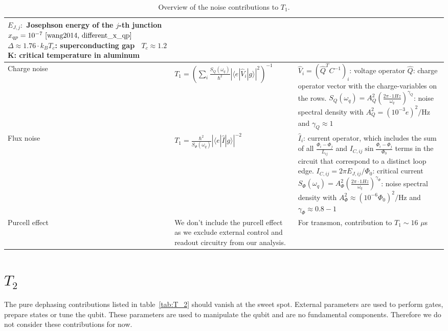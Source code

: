 \documentclass[]{article}
\newcommand{\ket}[1]{| #1 \rangle}
\newcommand{\bra}[1]{\langle #1 |}
\begin{document}
\begin{table}[h]
\begin{tabular}{|p{2cm}|p{5.7cm}|p{7.5cm}|}
$E_{J,j}:$ Josephson energy of the $j$-th junction \newline
$x_{qp}= 10^{-7}~\cite{wang2014, different_x_qp}$ \newline
$\Delta\approx 1.76 \cdot k_B T_c$: superconducting gap~\cite{gap} \newline
$T_c \approx 1.2$ K: critical temperature in aluminum~\cite{T_c} \\
\hline 
Charge noise & $T_1 = \left( \sum_{i} \frac{S_{Q}(\omega_q)}{\hbar^2} \left| \bra{e} \hat{V}_i \ket{g} \right|^{2} \right) ^{-1}$~\cite{yan2016}
& $\hat{V}_i=\left(\hat{Q}^T C^{-1} \right)_i$: voltage operator \newline 
$\hat{Q}$: charge operator vector with the charge-variables on the rows.\newline
$S_{Q}(\omega_q)=A_Q^2\left( \frac{2\pi \cdot 1 Hz}{\omega_q} \right)^{\gamma_Q}$: noise spectral density with $A_Q^2=(10^{-3}e)^2/$Hz and $\gamma_Q\approx1$~\cite{krantz2019} \\
\hline
Flux noise & $T_1 = \frac{\hbar^2}{S_{\Phi}(\omega_q)} \left| \bra{e} \hat{I} \ket{g} \right|^{-2}$~\cite{yan2016}
& $\hat{I}_i$: current operator, which includes the sum of all $\frac{\Phi_i-\Phi_j}{L_{ij}}$ and $I_{C, ij}  \sin \frac{\Phi_i-\Phi_j}{\Phi_0}$ terms in the circuit that correspond to a distinct loop edge. \newline 
$I_{C, ij} = 2 \pi E_{J, ij} / \Phi_0$: critical current \newline
$S_{\Phi}(\omega_q)=A_{\Phi}^2\left( \frac{2\pi \cdot 1 Hz}{\omega_q} \right)^{\gamma_{\Phi}}$: noise spectral density with $A_{\Phi}^2\approx(10^{-6} \Phi_0)^2/$Hz and $\gamma_{\Phi} \approx 0.8 - 1$~\cite{krantz2019} \\
\hline
Purcell effect & We don't include the purcell effect as we exclude external control and readout circuitry from our analysis. 
& For transmon, contribution to  $T_1 \sim 16$ $\mu$s~\cite{koch2007}  \\
\hline

\end{tabular} 
\caption{Overview of the noise contributions to $T_1$.}
\label{tab:T_1}
\end{table}


\section{$T_2$}
The pure dephasing contributions listed in table~\ref{tab:T_2} should vanish at the sweet spot. External parameters are used to perform gates, prepare states or tune the qubit. These parameters are used to manipulate the qubit and are no fundamental components. Therefore we do not consider these contributions for now.
\end{document}
